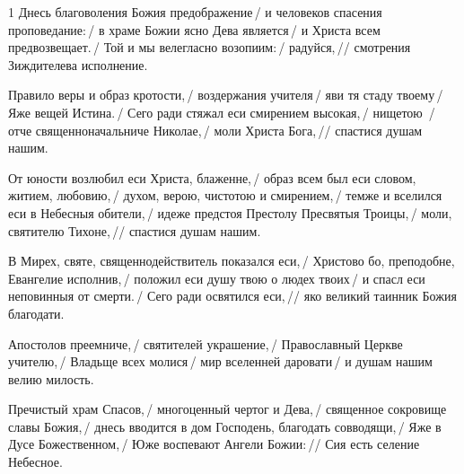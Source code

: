 \begin{hangparas}{\hpindent}{1}
\large
{}
Днесь благоволения Божия предображение\,/ и человеков
спасения проповедание:\,/ в храме Божии ясно Дева
является\,/ и Христа всем предвозвещает.\,/ Той и мы
велегласно возопиим:\,/ радуйся,\,// смотрения Зиждителева
исполнение.

Правило веры и образ кротости,\,/ воздержания учителя\,/
яви тя стаду твоему\,/ Яже вещей Истина.\,/ Сего ради
стяжал еси смирением высокая,\,/ нищетою \,/
отче священноначальниче Николае,\,/ моли Христа Бога,\,//
спастися душам нашим.

От юности возлюбил еси Христа, блаженне,\,/ образ всем был
еси словом, житием, любовию,\,/ духом, верою, чистотою и
смирением,\,/ темже и вселился еси в Небесныя обители,\,/
идеже предстоя Престолу Пресвятыя Троицы,\,/ моли, святителю
Тихоне,\,// спастися душам нашим.

В Мирех, святе, священнодействитель показался еси,\,/
Христово бо, преподобне, Евангелие исполнив,\,/ положил
еси душу твою о людех твоих\,/ и спасл еси неповинныя от
смерти.\,/ Сего ради освятился еси,\,// яко великий таинник
Божия благодати.

Апостолов преемниче,\,/ святителей украшение,\,/
Православный Церкве учителю,\,/ Владьще всех молися\,/ мир
вселенней даровати\,/ и душам нашим велию милость.

Пречистый храм Спасов,\,/ многоценный чертог и Дева,\,/
священное сокровище славы Божия,\,/ днесь вводится
в дом Господень, благодать совводящи,\,/ Яже в Дусе
Божественном,\,/ Юже воспевают Ангели Божии:\,// Сия есть
селение Небесное.

\end{hangparas}

%

